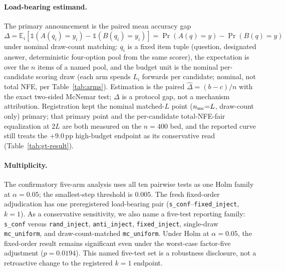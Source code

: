 \documentclass{article}
\newcommand{\sconf}{\texttt{s\_conf}}
\newcommand{\rinj}{\texttt{rand\_inject}}
\newcommand{\ainj}{\texttt{anti\_inject}}
\newcommand{\finj}{\texttt{fixed\_inject}}
\newcommand{\mcu}{\texttt{mc\_uniform}}
\newcommand{\pp}{\,\mathrm{pp}}
\newcommand{\EE}{\mathbb{E}}
\newcommand{\II}{\mathbb{1}}
\begin{document}
\paragraph{Load-bearing estimand.}
The primary announcement is the paired mean accuracy gap
$\Delta=\EE_i[\II(A(q_i){=}y_i){-}\II(B(q_i){=}y_i)]=\Pr(A(q){=}y){-}\Pr(B(q){=}y)$
under nominal draw-count matching: $q_i$ is a fixed item tuple (question,
designated answer, deterministic four-option pool from the same scorer), the
expectation is over the $n$ items of a named pool, and the budget unit is the
nominal per-candidate scoring draw (each arm spends $L_i$ forwards per
candidate; nominal, not total NFE, per Table~\ref{tab:arms}).  Estimation is
the paired $\widehat\Delta=(b-c)/n$ with the exact two-sided McNemar test;
$\Delta$ is a protocol gap, not a mechanism attribution.  Registration kept
the nominal matched-$L$ point ($n_{\rm mc}{=}L$, draw-count only) primary; that
primary point and the per-candidate total-NFE-fair equalization at $2L$ are
both measured on the $n{=}400$ bed, and the reported curve still treats the
$+9.0\pp$ high-budget endpoint as its conservative read
(Table~\ref{tab:gt-result}).

\paragraph{Multiplicity.}
The confirmatory five-arm analysis uses all ten pairwise tests as one Holm
family \citep{holm1979} at $\alpha=0.05$; the smallest-step threshold is $0.005$.  The fresh
fixed-order adjudication has one preregistered load-bearing pair
(\sconf{}--\finj{}, $k=1$).  As a conservative sensitivity, we also name a
five-test reporting family: \sconf{} versus \rinj{}, \ainj{}, \finj{},
single-draw \mcu{}, and draw-count-matched \mcu{}.  Under Holm at
$\alpha=0.05$, the fixed-order result remains significant even under the
worst-case factor-five adjustment ($p=0.0194$).  This named five-test set is a
robustness disclosure, not a retroactive change to the registered $k=1$
endpoint.
\end{document}
